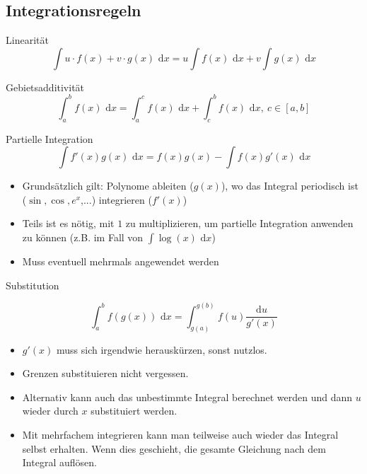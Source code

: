 \documentclass[a4paper,10pt]{article}
\def\dx{\text{ d}x}
\begin{document}
\subsection{Integrationsregeln}
\begin{subbox}{Linearität}
	\vspace{-12pt}
	$$\int u\cdot f(x) + v \cdot g(x) \dx = u \int f(x) \dx + v \int g(x) \dx$$
\end{subbox}
\begin{subbox}{Gebietsadditivität}
	\vspace{-12pt}
	$$\int_a^b f(x) \dx = \int_a^c f(x) \dx + \int_c^b f(x) \dx, \ c \in [a,b]$$
\end{subbox}
\begin{mainbox}{Partielle Integration}
	\vspace{-12pt}
	$$\int f'(x) g(x) \dx = f(x)g(x) - \int f(x) g'(x) \dx$$
\end{mainbox}
\begin{itemize}
	\item Grundsätzlich gilt: Polynome ableiten ($g(x)$), wo das Integral periodisch ist ($\sin, \cos, e^x$,...) integrieren ($f'(x)$)
	\item Teils ist es nötig, mit $1$ zu multiplizieren, um partielle Integration anwenden zu können (z.B. im Fall von $\int \log(x) \dx$)
	\item Muss eventuell mehrmals angewendet werden
\end{itemize}
\begin{mainbox}{Substitution}
	 
	$$\int_a^b f(g(x)) \dx = \int_{g(a)}^{g(b)} f(u) \frac{\text{d}u}{g'(x)}$$
\end{mainbox}

\begin{itemize}
	\item $g'(x)$ muss sich irgendwie herauskürzen, sonst nutzlos.
	\item Grenzen substituieren nicht vergessen.
	\item Alternativ kann auch das unbestimmte Integral berechnet werden und dann $u$ wieder durch $x$ substituiert werden.
	\item Mit mehrfachem integrieren kann man teilweise auch wieder das Integral selbst erhalten. Wenn dies geschieht, die gesamte Gleichung nach dem Integral auflösen.
\end{itemize}
\end{document}
